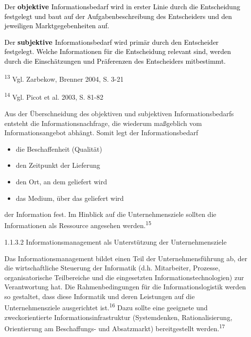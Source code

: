 \documentclass[a4paper]{article}
\newcommand\liststyleLiii{%
\renewcommand\labelitemi{•}
\renewcommand\labelitemii{•}
\renewcommand\labelitemiii{•}
\renewcommand\labelitemiv{•}
}
\begin{document}
{\sffamily
\textcolor{black}{Der }\textbf{\textcolor{black}{objektive }}\textcolor{black}{Informationsbedarf wird in erster Linie
durch die Entscheidung festgelegt und baut auf der Aufgabenbeschreibung des Entscheiders und den jeweiligen
Marktgegebenheiten auf.}}

{\sffamily
\textcolor{black}{Der }\textbf{\textcolor{black}{subjektive }}\textcolor{black}{Informationsbedarf wird primär durch den
Entscheider festgelegt. Welche Informationen für die Entscheidung relevant sind, werden durch die Einschätzungen und
Präferenzen des Entscheiders mitbestimmt.}}


\bigskip


\bigskip


\bigskip

{\sffamily\color{black}
\textsuperscript{13} Vgl. Zarbekow, Brenner 2004, S. 3-21}

{\sffamily\color{black}
\textsuperscript{14} Vgl. Picot et al. 2003, S. 81-82}

{\sffamily\color{black}
Aus der Überschneidung des objektiven und subjektiven Informationsbedarfs entsteht die Informationsnachfrage, die
wiederum maßgeblich vom Informationsangebot abhängt. Somit legt der Informationsbedarf}


\bigskip

\liststyleLiii
\begin{itemize}
\item {\sffamily\color{black}
die Beschaffenheit (Qualität)}
\item {\sffamily\color{black}
den Zeitpunkt der Lieferung}
\item {\sffamily\color{black}
den Ort, an dem geliefert wird }
\item {\sffamily\color{black}
das Medium, über das geliefert wird}
\end{itemize}

\bigskip

{\sffamily\color{black}
der Information fest. Im Hinblick auf die Unternehmensziele sollten die Informationen als Ressource angesehen
werden.\textsuperscript{15} }


\bigskip

{\sffamily\color{black}
1.1.3.2 Informationsmanagement als Unterstützung der Unternehmensziele\newline
}

{\sffamily\color{black}
Das Informationsmanagement bildet einen Teil der Unternehmensführung ab, der die wirtschaftliche Steuerung der
Informatik (d.h. Mitarbeiter, Prozesse, organisatorische Teilbereiche und die eingesetzten Informationstechnologien)
zur Verantwortung hat. Die Rahmenbedingungen für die Informationslogistik werden so gestaltet, dass diese Informatik
und deren Leistungen auf die Unternehmensziele ausgerichtet ist.\textsuperscript{16} Dazu sollte eine geeignete und
zweckorientierte Informationsinfrastruktur (Systemdenken, Rationalisierung, Orientierung am Beschaffungs- und
Absatzmarkt) bereitgestellt werden.\textsuperscript{17}}
\end{document}
